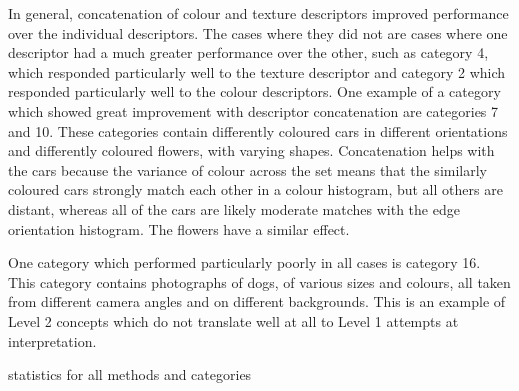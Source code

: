 In general, concatenation of colour and texture descriptors improved performance over the individual descriptors. The cases where they did not are cases where one descriptor had a much greater performance over the other, such as category 4, which responded particularly well to the texture descriptor and category 2 which responded particularly well to the colour descriptors. One example of a category which showed great improvement with descriptor concatenation are categories 7 and 10. These categories contain differently coloured cars in different orientations and differently coloured flowers, with varying shapes. Concatenation helps with the cars because the variance of colour across the set means that the similarly coloured cars strongly match each other in a colour histogram, but all others are distant, whereas all of the cars are likely moderate matches with the edge orientation histogram. The flowers have a similar effect.

One category which performed particularly poorly in all cases is category 16. This category contains photographs of dogs, of various sizes and colours, all taken from different camera angles and on different backgrounds. This is an example of Level 2 concepts which do not translate well at all to Level 1 attempts at interpretation.


\begin{table}[ht]
	\caption{ statistics for all methods and categories}
	\label{tbl:map-stats}
	\centering
\end{table}

